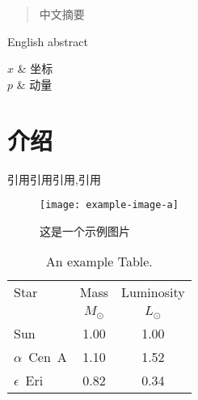 \documentclass[type=master]{YNUthesis} %
\begin{document}
\raggedbottom

\frontmatter

\begin{abstract}
	中文摘要
\end{abstract}

\begin{abstract*}
	English abstract
\end{abstract*}

\tableofcontents
\listoffigures
\listoftables

\begin{notation}[ll]
	$x$                  & 坐标        \\
	$p$                  & 动量        \\
\end{notation}

\mainmatter

%   
%   
%   

\chapter{介绍}

\zhlipsum
引用\cite{BQC_2020}引用\cite{向守平2008天体物理概论}引用\cite{2019First},引用\cite{BQC_2020,向守平2008天体物理概论,2019First}

\begin{figure}[htbp]
	\centering
	\texttt{[image: example-image-a]}%
	\caption{这是一个示例图片}
	\label{fig:一个示例图片}
\end{figure}

\zhlipsum

\begin{table}[htbp]
	\centering
	\caption{An example Table.}
	\label{tab:example-tab}
	\begin{tabular}{lcc}
		\toprule
		Star           & Mass        & Luminosity  \\
		               & $M_{\odot}$ & $L_{\odot}$ \\
		\midrule
		Sun            & 1.00        & 1.00        \\
		$\alpha$~Cen~A & 1.10        & 1.52        \\
		$\epsilon$~Eri & 0.82        & 0.34        \\
		\bottomrule
	\end{tabular}
\end{table}
\end{document}
